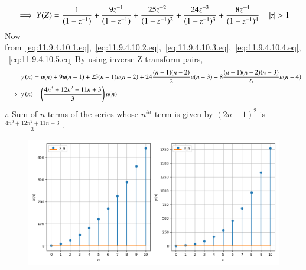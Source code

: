\documentclass[journal,12pt,onecolumn]{IEEEtran}
\theoremstyle{remark}
\begin{document}
 \begin{equation}
\implies Y(Z)=\frac{1}{(1-z^{-1})} +\frac{9z^{-1}}{(1-z^{-1})} + \frac{25z^{-2}}{(1-z^{-1})^2} + \frac{24z^{-3}}{(1-z^{-1})^3} + \frac{8z^{-4}}{(1-z^{-1})^4} \quad \left\vert z\right\vert>1  \label{eq:11.9.4.10.5.eq}
 \end{equation}
Now from~\eqref{eq:11.9.4.10.1.eq},~\eqref{eq:11.9.4.10.2.eq},~\eqref{eq:11.9.4.10.3.eq},~\eqref{eq:11.9.4.10.4.eq},
 ~\eqref{eq:11.9.4.10.5.eq}
By using  inverse Z-transform pairs,
\begin{align}
  y\left(n\right)&= u(n) + 9u(n-1) + 25(n-1)u(n-2) + 24\frac{(n-1)(n-2)}{2}u(n-3) + 8\frac{(n-1)(n-2)(n-3)}{6}u(n-4) \\
\implies  y\left(n\right) &=\left(\frac{4n^{3}+12n^{2}+11n+3}{3}\right)u(n)
\end{align}
$\therefore$ Sum of $n$ terms of the series whose $n^{th}$ term is given by $(2n+1)^2$ is $\frac{4n^{3}+12n^{2}+11n+3}{3}$  .
\begin{figure}[h]
    \centering
     \includegraphics[width=\columnwidth]{./figs/fig2.png}
    \caption{ }
    \label{}
\end{figure}
\end{document}
